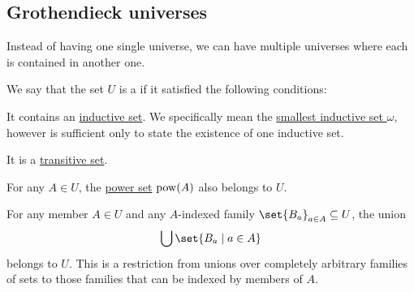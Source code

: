 \subsection{Grothendieck universes}\label{subsec:grothendieck_universes}

Instead of having one single universe, we can have multiple universes where each is contained in another one.

\begin{definition}\label{def:grothendieck_universe}
  We say that the set \( U \) is a  if it satisfied the following conditions:
  \begin{thmenum}
     It contains an \hyperref[def:inductive_set]{inductive set}. We specifically mean the \hyperref[thm:smallest_inductive_set_existence]{smallest inductive set \( \omega \)}, however is sufficient only to state the existence of one inductive set.

     It is a \hyperref[def:transitive_set]{transitive set}.

     For any \( A \in U \), the \hyperref[def:basic_set_operations/power_set]{power set} \( \operatorname{pow}(A) \) also belongs to \( U \).

     For any member \( A \in U \) and any \( A \)-indexed family \( \set{ B_a }_{a \in A} \subseteq U \), the union
    \begin{equation*}
      \bigcup\set{ B_a \given a \in A }
    \end{equation*}
    belongs to \( U \). This is a restriction from unions over completely arbitrary families of sets to those families that can be indexed by members of \( A \).
  \end{thmenum}


\end{definition}

